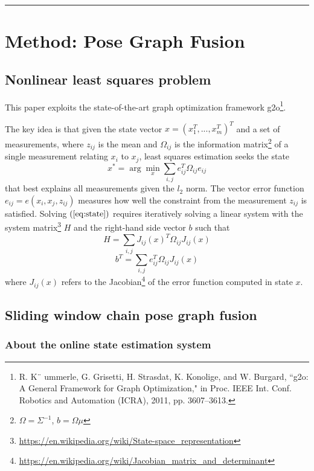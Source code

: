 \documentclass[letterpaper,10pt]{article}
\begin{document}
\begin{center}\rule{\textwidth}{1pt}\end{center}
\section{Method: Pose Graph Fusion}

\subsection{Nonlinear least squares problem}

This paper exploits the state-of-the-art graph optimization framework g2o\footnote{R. K¨ ummerle, G. Grisetti, H. Strasdat, K. Konolige, and W. Burgard, ``g2o: A General Framework for Graph Optimization," in Proc. IEEE Int. Conf. Robotics and Automation (ICRA), 2011, pp. 3607–3613.}.

The key idea is that given the state vector $x=(x_1^T, ..., x_m^T)^T$ and a set of measurements, where $z_{ij}$ is the mean and $\Omega_{ij}$ is the information matrix\footnote{$\Omega=\Sigma^{-1}$, $b=\Omega \mu$} of a single measurement relating $x_i$ to $x_j$, least squares estimation seeks the state
\begin{equation}
x^*=\arg\min_x{\sum_{i,j}e_{ij}^T\Omega_{ij}e_{ij}}
\label{eq:state}
\end{equation}
that best explains all measurements given the $\mathit{l}_2$ norm. The vector error function $e_{ij}=e(x_i,x_j,z_{ij})$ measures how well the constraint from the measurement $z_{ij}$ is satisfied. Solving $(\ref{eq:state})$ requires iteratively solving a linear system with the system matrix\footnote{\url{https://en.wikipedia.org/wiki/State-space_representation}} $H$ and the right-hand side vector $b$ such that
$$H=\sum_{i,j}{J_{ij}(x)^T\Omega_{ij}J_{ij}(x)}$$
$$b^T=\sum_{i,j}e_{ij}^T\Omega_{ij}J_{ij}(x)$$
where $J_{ij}(x)$ refers to the Jacobian\footnote{\url{https://en.wikipedia.org/wiki/Jacobian_matrix_and_determinant}} of the error function computed in state $x$.

\subsection{Sliding window chain pose graph fusion}

\subsubsection{About the online state estimation system}
\end{document}
